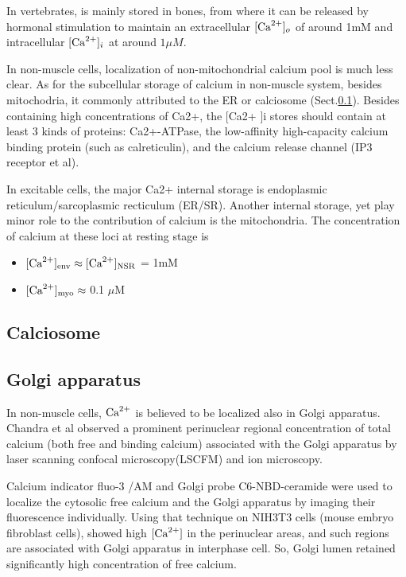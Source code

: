 In vertebrates,  is mainly stored in bones, from where it
can be released by hormonal stimulation to maintain an extracellular
$[\ce{Ca^2+}]_o$ of around 1mM and intracellular $[\ce{Ca^2+}]_i$ at
around $1\mu M$. 

In non-muscle cells, localization of non-mitochondrial calcium pool is much less
clear. As for the subcellular storage of calcium in non-muscle system, besides
mitochodria, it commonly attributed to the ER or calciosome
(Sect.\ref{sec:calciosome}). Besides containing high concentrations of Ca2+, the
[Ca2+ ]i stores should contain at least 3 kinds of proteins: Ca2+-ATPase, the
low-affinity high-capacity calcium binding protein (such as calreticulin), and
the calcium release channel (IP3 receptor et al).

In excitable cells, the major Ca2+ internal storage is endoplasmic
reticulum/sarcoplasmic recticulum (ER/SR). Another internal storage, yet play
minor role to the contribution of calcium is the mitochondria. The concentration
of calcium at these loci at resting stage is
\begin{itemize}
\item $[{\text{Ca}^{2+}}]_\text{env} \approx [{\text{Ca}^{2+}}]_\text{NSR}$ = 1mM 
\item $[{\text{Ca}^{2+}}]_\text{myo} \approx$ 0.1 $\mu$M 
\end{itemize}


\subsection{Calciosome}
\label{sec:calciosome}


\subsection{Golgi apparatus}
\label{sec:Golgi-calcium}

In non-muscle cells, ${\text{Ca}^{2+}}$ is believed to be localized also in Golgi apparatus.
Chandra et al observed a prominent perinuclear regional concentration of total
calcium (both free and binding calcium) associated with the Golgi apparatus by
laser scanning confocal microscopy(LSCFM) and ion microscopy.

Calcium indicator fluo-3 /AM and Golgi probe C6-NBD-ceramide were used to
localize the cytosolic free calcium and the Golgi apparatus by imaging their
fluorescence individually.
Using that technique on NIH3T3 cells (mouse embryo fibroblast cells),
showed high $[{\text{Ca}^{2+}}]$ in the perinuclear areas, and such regions are associated
with Golgi apparatus in interphase cell. So, Golgi lumen retained significantly
high concentration of free calcium.

